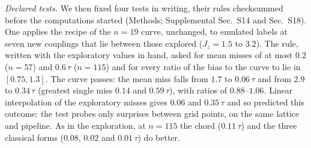 \documentclass[aps,prx,twocolumn,10pt,superscriptaddress,nofootinbib,longbibliography,floatfix]{revtex4-2}
\theoremstyle{remark}
\newcommand{\Jz}{J_z}
\begin{document}
\emph{Declared tests.} We then fixed four tests in writing, their rules checksummed before the computations started
(Methods; Supplemental Sec.~S14 and Sec.~S18). One applies the recipe of the $n=19$ curve, unchanged, to emulated
labels at seven new couplings that lie between those explored ($\Jz=1.5$ to $3.2$). The rule, written with the %
exploratory values in hand, asked for mean misses of at most $0.2$ ($n=57$) and $0.6\,\tau$ ($n=115$) and for every %
ratio of the bias to the curve to lie in $[0.75,1.3]$. The curve passes: the mean miss falls from $1.7$ to %
$0.06\,\tau$ and from $2.9$ to $0.34\,\tau$ (greatest single miss $0.14$ and $0.59\,\tau$), with ratios of %
$0.88$--$1.06$. Linear interpolation of the exploratory misses gives $0.06$ and $0.35\,\tau$ and so predicted this %
outcome: the test probes only surprises between grid points, on the same lattice and pipeline.
As in the exploration, at $n=115$ the chord ($0.11\,\tau$) and the three classical forms ($0.08$, $0.02$ and $0.01\,\tau$) do better. %
\end{document}

